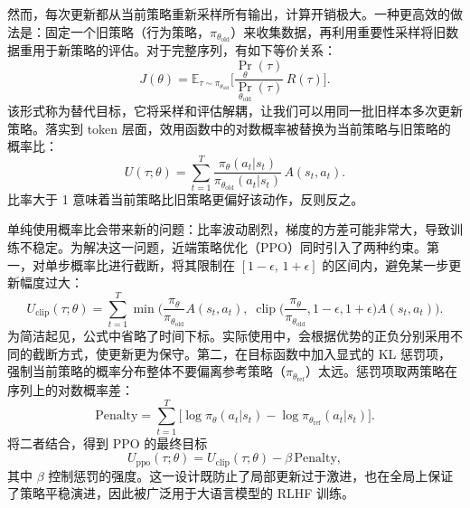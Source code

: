\documentclass{article}
\begin{document}
然而，每次更新都从当前策略重新采样所有输出，计算开销极大。一种更高效的做法是：固定一个旧策略（行为策略，\(\pi_{\theta_{\mathrm{old}}}\)）来收集数据，再利用重要性采样将旧数据重用于新策略的评估。对于完整序列，有如下等价关系：
\begin{equation}
J(\theta) = \mathbb{E}_{\tau\sim\pi_{\theta_{\mathrm{old}}}}\Big[\frac{\Pr_{\theta}(\tau)}{\Pr_{\theta_{\mathrm{old}}}(\tau)}\,R(\tau)\Big].
\end{equation}
该形式称为替代目标，它将采样和评估解耦，让我们可以用同一批旧样本多次更新策略。落实到 token 层面，效用函数中的对数概率被替换为当前策略与旧策略的概率比：
\begin{equation}
U(\tau;\theta) = \sum_{t=1}^{T} \frac{\pi_{\theta}(a_t|s_t)}{\pi_{\theta_{\mathrm{old}}}(a_t|s_t)}\,A(s_t,a_t).
\end{equation}
比率大于 1 意味着当前策略比旧策略更偏好该动作，反则反之。

单纯使用概率比会带来新的问题：比率波动剧烈，梯度的方差可能非常大，导致训练不稳定。为解决这一问题，近端策略优化（PPO）同时引入了两种约束。第一，对单步概率比进行截断，将其限制在 \([1-\epsilon,\,1+\epsilon]\) 的区间内，避免某一步更新幅度过大：
\begin{equation}
    U_{\mathrm{clip}}(\tau;\theta) = \sum_{t=1}^{T} \min\Big( \frac{\pi_{\theta}}{\pi_{\theta_{\mathrm{old}}}} A(s_t,a_t),\; \operatorname{clip}\big(\frac{\pi_{\theta}}{\pi_{\theta_{\mathrm{old}}}}, 1-\epsilon, 1+\epsilon\big) A(s_t,a_t) \Big).
\end{equation}
为简洁起见，公式中省略了时间下标。实际使用中，会根据优势的正负分别采用不同的截断方式，使更新更为保守。第二，在目标函数中加入显式的 KL 惩罚项，强制当前策略的概率分布整体不要偏离参考策略（\(\pi_{\theta_{\mathrm{ref}}}\)）太远。惩罚项取两策略在序列上的对数概率差：
\begin{equation}
\mathrm{Penalty} = \sum_{t=1}^{T}\Big[\log \pi_{\theta}(a_t|s_t) - \log \pi_{\theta_{\mathrm{ref}}}(a_t|s_t)\Big].
\end{equation}
将二者结合，得到 PPO 的最终目标
\begin{equation}
U_{\mathrm{ppo}}(\tau;\theta) = U_{\mathrm{clip}}(\tau;\theta) - \beta\,\mathrm{Penalty},
\label{eq:ppo-objective}
\end{equation}
其中 \(\beta\) 控制惩罚的强度。这一设计既防止了局部更新过于激进，也在全局上保证了策略平稳演进，因此被广泛用于大语言模型的 RLHF 训练。
\end{document}

